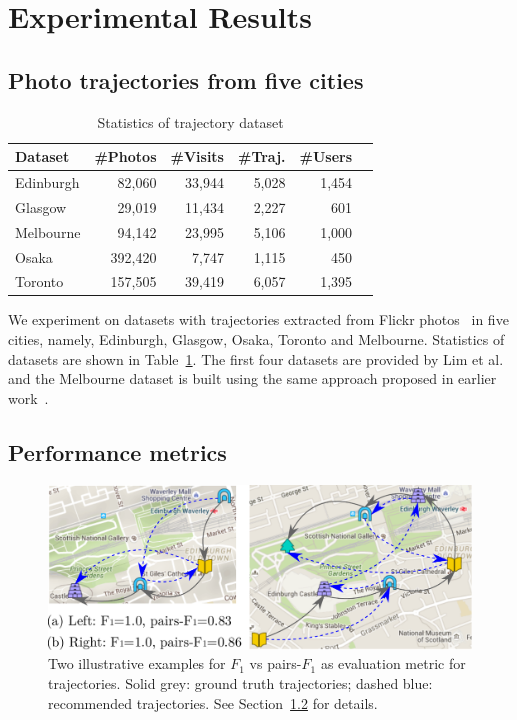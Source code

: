 
\section{Experimental Results}
\label{sec:experiment}
\secmoveup

\subsection{Photo trajectories from five cities}
\label{sec:dataset}
\secmoveup

\begin{table}
\caption{Statistics of trajectory dataset}
\label{tab:data}
\centering
\begin{tabular}{l*{5}{r}} \hline
\textbf{Dataset} & \textbf{\#Photos} & \textbf{\#Visits} & \textbf{\#Traj.} & \textbf{\#Users} \\ \hline
Edinburgh & 82,060 & 33,944 & 5,028 & 1,454 \\
Glasgow & 29,019 & 11,434 & 2,227 & 601 \\
Melbourne & 94,142 & 23,995 & 5,106 & 1,000 \\
Osaka & 392,420 & 7,747 & 1,115 & 450 \\
Toronto & 157,505 & 39,419 & 6,057 & 1,395 \\
\hline
\end{tabular}\captionmoveup
\end{table}


We experiment on datasets with trajectories extracted from Flickr photos~\cite{thomee2016yfcc100m} in five cities, 
namely, Edinburgh, Glasgow, Osaka, Toronto and Melbourne.
Statistics of datasets are shown in Table~\ref{tab:data}.
The first four datasets are provided by Lim et al.~\cite{ijcai15} and the Melbourne dataset is built using
the same approach proposed in earlier work~\cite{ht10, ijcai15}.

\subsection{Performance metrics}
\label{sec:metric}
\secmoveup

\begin{figure}[t]
	\centering
	\includegraphics[width=\columnwidth]{fig/pairF1.pdf}
	\caption{Two illustrative examples for $F_1$ vs pairs-$F_1$ as evaluation metric for trajectories. Solid grey: ground truth trajectories; dashed blue: recommended trajectories.
    See Section~\ref{sec:metric} for details.}
	\label{fig:pairf1}\captionmoveup
\end{figure}
%


